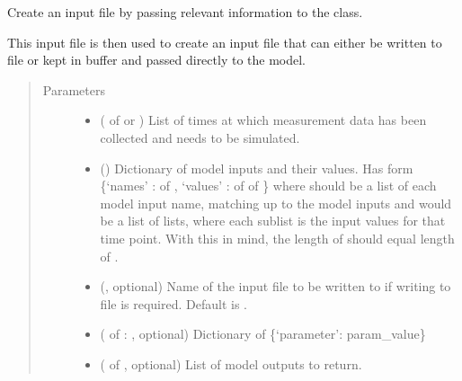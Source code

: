 \documentclass[letterpaper,10pt,english]{sphinxmanual}
\begin{document}
\begin{fulllineitems}
\label{\detokenize{bcmdModel:bayescmd.bcmdModel.InputCreator}}
Create an input file by passing relevant information to the class.

This input file is then used to create an input file that can either be
written to file or kept in buffer and passed directly to the model.
\begin{quote}\begin{description}
\item[{Parameters}] \leavevmode\begin{itemize}
\item {} 
 ( of  or ) \textendash{} List of times at which measurement data has been collected and needs
to be simulated.

\item {} 
 () \textendash{} Dictionary of model inputs and their values. Has form
\{‘names’ :  of ,
‘values’ :  of  of \}
where  should be a list of each model input name, matching up to
the model inputs and  would be a list of lists, where each
sublist is the input values for that time point. With this in mind,
the length of  should equal length of .

\item {} 
 (, optional) \textendash{} Name of the input file to be written to if writing to file is required.
Default is .

\item {} 
 ( of : , optional) \textendash{} Dictionary of \{‘parameter’: param\_value\}

\item {} 
 ( of , optional) \textendash{} List of model outputs to return.

\end{itemize}


\end{description}
\end{quote}
\end{fulllineitems}
\end{document}

